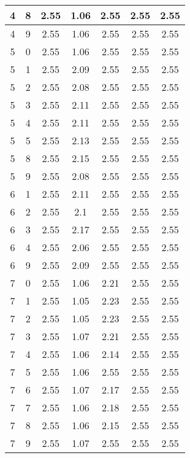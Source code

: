 \begin{longtable}{|c|c||c||c|c||c|c|}
	4 & 8 & 2.55 & 1.06 & 2.55 & 2.55 & 2.55 \\ \hline
	4 & 9 & 2.55 & 1.06 & 2.55 & 2.55 & 2.55 \\ \hline
	5 & 0 & 2.55 & 1.06 & 2.55 & 2.55 & 2.55 \\ \hline
	5 & 1 & 2.55 & 2.09 & 2.55 & 2.55 & 2.55 \\ \hline
	5 & 2 & 2.55 & 2.08 & 2.55 & 2.55 & 2.55 \\ \hline
	5 & 3 & 2.55 & 2.11 & 2.55 & 2.55 & 2.55 \\ \hline
	5 & 4 & 2.55 & 2.11 & 2.55 & 2.55 & 2.55 \\ \hline
	5 & 5 & 2.55 & 2.13 & 2.55 & 2.55 & 2.55 \\ \hline
	5 & 8 & 2.55 & 2.15 & 2.55 & 2.55 & 2.55 \\ \hline
	5 & 9 & 2.55 & 2.08 & 2.55 & 2.55 & 2.55 \\ \hline
	6 & 1 & 2.55 & 2.11 & 2.55 & 2.55 & 2.55 \\ \hline
	6 & 2 & 2.55 & 2.1 & 2.55 & 2.55 & 2.55 \\ \hline
	6 & 3 & 2.55 & 2.17 & 2.55 & 2.55 & 2.55 \\ \hline
	6 & 4 & 2.55 & 2.06 & 2.55 & 2.55 & 2.55 \\ \hline
	6 & 9 & 2.55 & 2.09 & 2.55 & 2.55 & 2.55 \\ \hline
	7 & 0 & 2.55 & 1.06 & 2.21 & 2.55 & 2.55 \\ \hline
	7 & 1 & 2.55 & 1.05 & 2.23 & 2.55 & 2.55 \\ \hline
	7 & 2 & 2.55 & 1.05 & 2.23 & 2.55 & 2.55 \\ \hline
	7 & 3 & 2.55 & 1.07 & 2.21 & 2.55 & 2.55 \\ \hline
	7 & 4 & 2.55 & 1.06 & 2.14 & 2.55 & 2.55 \\ \hline
	7 & 5 & 2.55 & 1.06 & 2.55 & 2.55 & 2.55 \\ \hline
	7 & 6 & 2.55 & 1.07 & 2.17 & 2.55 & 2.55 \\ \hline
	7 & 7 & 2.55 & 1.06 & 2.18 & 2.55 & 2.55 \\ \hline
	7 & 8 & 2.55 & 1.06 & 2.15 & 2.55 & 2.55 \\ \hline
	7 & 9 & 2.55 & 1.07 & 2.55 & 2.55 & 2.55 \\ \hline
\end{longtable}
\clearpage{}
